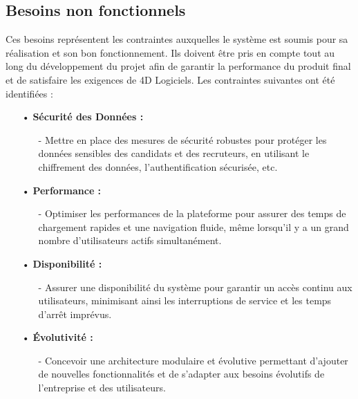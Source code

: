 \subsection{Besoins non fonctionnels}

Ces besoins représentent les 
contraintes auxquelles le système est soumis pour sa réalisation et son bon 
fonctionnement. Ils doivent être pris en compte tout au long du développement 
du projet afin de garantir la performance du produit final et de satisfaire les 
exigences de 4D Logiciels. Les contraintes suivantes ont 
été identifiées :

\begin{itemize}
    \setlength{\itemsep}{0.3cm}
    \item[•] \textbf{ Sécurité des Données :}
    \begin{itemize}
        \setlength{\itemsep}{0.2cm}
        \item[-] Mettre en place des mesures de sécurité robustes pour protéger les 
        données sensibles des candidats et des recruteurs, en utilisant le 
        chiffrement des données, l'authentification sécurisée, etc.        
    \end{itemize}
    \item[•] \textbf{Performance :}
    \begin{itemize}
        \setlength{\itemsep}{0.2cm}
        \item[-]Optimiser les performances de la plateforme pour assurer des temps 
        de chargement rapides et une navigation fluide, même lorsqu'il y a 
        un grand nombre d'utilisateurs actifs simultanément.
    \end{itemize}
    \item[•] \textbf{Disponibilité :}
    \begin{itemize}
        \setlength{\itemsep}{0.2cm}
        \item[-] Assurer une disponibilité du système pour garantir un accès 
        continu aux utilisateurs, minimisant ainsi les interruptions de service 
        et les temps d'arrêt imprévus.
    \end{itemize}
    \item[•] \textbf{Évolutivité :}
    \begin{itemize}
        \setlength{\itemsep}{0.2cm}
        \item[-] Concevoir une architecture modulaire et évolutive permettant 
        d'ajouter de nouvelles fonctionnalités et de s'adapter aux besoins évolutifs 
        de l'entreprise et des utilisateurs.
    \end{itemize}
\end{itemize}


